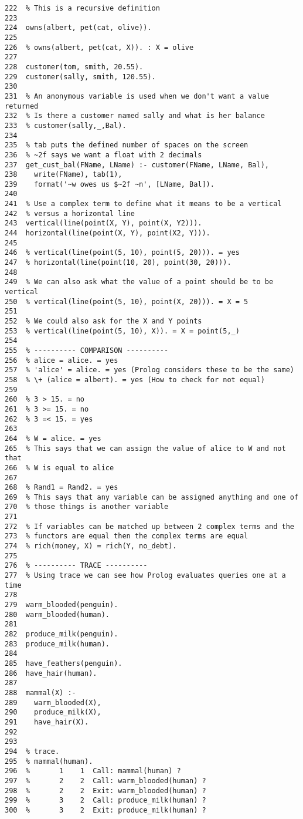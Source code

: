\documentclass[11pt]{article}
\begin{document}
\begin{verbatim}
222  % This is a recursive definition
223  
224  owns(albert, pet(cat, olive)).
225  
226  % owns(albert, pet(cat, X)). : X = olive
227  
228  customer(tom, smith, 20.55).
229  customer(sally, smith, 120.55).
230  
231  % An anonymous variable is used when we don't want a value returned
232  % Is there a customer named sally and what is her balance
233  % customer(sally,_,Bal).
234  
235  % tab puts the defined number of spaces on the screen
236  % ~2f says we want a float with 2 decimals
237  get_cust_bal(FName, LName) :- customer(FName, LName, Bal),
238    write(FName), tab(1),
239    format('~w owes us $~2f ~n', [LName, Bal]).
240  
241  % Use a complex term to define what it means to be a vertical
242  % versus a horizontal line
243  vertical(line(point(X, Y), point(X, Y2))).
244  horizontal(line(point(X, Y), point(X2, Y))).
245  
246  % vertical(line(point(5, 10), point(5, 20))). = yes
247  % horizontal(line(point(10, 20), point(30, 20))).
248  
249  % We can also ask what the value of a point should be to be vertical
250  % vertical(line(point(5, 10), point(X, 20))). = X = 5
251  
252  % We could also ask for the X and Y points
253  % vertical(line(point(5, 10), X)). = X = point(5,_)
254  
255  % ---------- COMPARISON ----------
256  % alice = alice. = yes
257  % 'alice' = alice. = yes (Prolog considers these to be the same)
258  % \+ (alice = albert). = yes (How to check for not equal)
259  
260  % 3 > 15. = no
261  % 3 >= 15. = no
262  % 3 =< 15. = yes
263  
264  % W = alice. = yes
265  % This says that we can assign the value of alice to W and not that
266  % W is equal to alice
267  
268  % Rand1 = Rand2. = yes
269  % This says that any variable can be assigned anything and one of
270  % those things is another variable
271  
272  % If variables can be matched up between 2 complex terms and the
273  % functors are equal then the complex terms are equal
274  % rich(money, X) = rich(Y, no_debt).
275  
276  % ---------- TRACE ----------
277  % Using trace we can see how Prolog evaluates queries one at a time
278  
279  warm_blooded(penguin).
280  warm_blooded(human).
281  
282  produce_milk(penguin).
283  produce_milk(human).
284  
285  have_feathers(penguin).
286  have_hair(human).
287  
288  mammal(X) :-
289    warm_blooded(X),
290    produce_milk(X),
291    have_hair(X).
292  
293  
294  % trace.
295  % mammal(human).
296  %       1    1  Call: mammal(human) ?
297  %       2    2  Call: warm_blooded(human) ?
298  %       2    2  Exit: warm_blooded(human) ?
299  %       3    2  Call: produce_milk(human) ?
300  %       3    2  Exit: produce_milk(human) ?

\end{verbatim}
\end{document}
